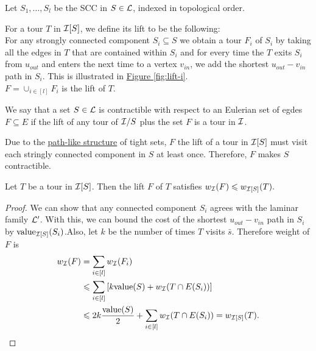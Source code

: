 \documentclass[./main.tex]{subfiles}
\begin{document}
	
	Let $S_1, \dots, S_l$ be the SCC in $S \in \mathcal{L}$, indexed in topological order.
	\begin{definition}\label{def:3:indu-lift}
		For a tour $T$ in $\mathcal{I}[S]$, we define its lift to be the following:\\
		For any strongly connected component $S_i \subseteq S$ we obtain a tour $F_i$ of $S_i$ by taking all the edges in $T$ that are contained within $S_i$ and for every time the $T$ exits $S_i$ from $u_{out}$ and enters the next time to a vertex $v_{in}$, we add the shortest $u_{out} - v_{in}$ path in $S_i$. 
		This is illustrated in \hyperref[fig:lift-i]{Figure \ref{fig:lift-i}}.\\
		$F = \cup_{i \in [l]} F_i$ is the lift of $T$.\\
	\end{definition}
	
	
	\begin{definition}
		We say that a set $S \in \mathcal{L}$ is contractible with respect to an Eulerian set of egdes $F \subseteq E$ if the lift of any tour of $\mathcal{I}/S$ plus the set $F$ is a tour in $\mathcal{I}$.\\
	\end{definition}
	
	Due to the \hyperref[fig:tightPath]{path-like structure} of tight sets, $F$ the lift of a tour in $\mathcal{I}[S]$ must visit each stringly connected component in $S$ at least once. Therefore, $F$ makes $S$ contractible.\\
		
	\begin{lemma}\label{lemm:3:lift-i}
		Let $T$ be a tour in $\mathcal{I}[S]$. Then the lift $F$ of $T$ satisfies $w_{\mathcal{I}}(F) \leqslant w_{\mathcal{I}[S]}(T).$
	\end{lemma}
	\begin{proof}
		We can show that any connected component $S_i$ agrees with the laminar family $\mathcal{L}'$. With this, we can bound the cost of the shortest $u_{out} - v_{in}$ path in $S_i$ by $\textup{value}_{\mathcal{I}[S]}(S_i)$.Also, let $k$ be the number of times $T$ visits $\bar{s}$. Therefore weight of $F$ is
		\begin{align*}
			w_{\mathcal{I}}(F) &= \sum_{i \in [l]} w_{\mathcal{I}}(F_i)\\
			&\leqslant \sum_{i \in [l]} \left[k\textup{value}(S) + w_{\mathcal{I}}(T \cap E(S_i))\right]\\
			&\leqslant 2k \frac{\textup{value}(S)}{2} + \sum_{i \in [l]}w_{\mathcal{I}}(T \cap E(S_i)) = w_{\mathcal{I}[S]}(T).
		\end{align*}
	\end{proof}
\end{document}
